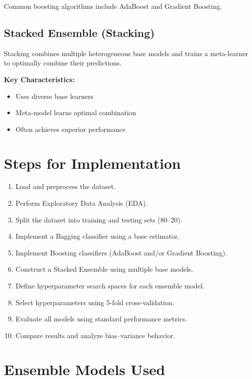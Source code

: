 \documentclass[11pt]{article}
\begin{document}
Common boosting algorithms include AdaBoost and Gradient Boosting.

\subsection*{Stacked Ensemble (Stacking)}
Stacking combines multiple heterogeneous base models and trains a meta-learner to optimally combine their predictions.

\textbf{Key Characteristics:}
\begin{itemize}
    \item Uses diverse base learners
    \item Meta-model learns optimal combination
    \item Often achieves superior performance
\end{itemize}


\section*{Steps for Implementation}

\begin{enumerate}[label=\arabic*.]
    \item Load and preprocess the dataset.
    \item Perform Exploratory Data Analysis (EDA).
    \item Split the dataset into training and testing sets (80--20).
    \item Implement a Bagging classifier using a base estimator.
    \item Implement Boosting classifiers (AdaBoost and/or Gradient Boosting).
    \item Construct a Stacked Ensemble using multiple base models.
    \item Define hyperparameter search spaces for each ensemble model.
    \item Select hyperparameters using 5-fold cross-validation.
    \item Evaluate all models using standard performance metrics.
    \item Compare results and analyze bias--variance behavior.
\end{enumerate}


\section*{Ensemble Models Used}
\end{document}
